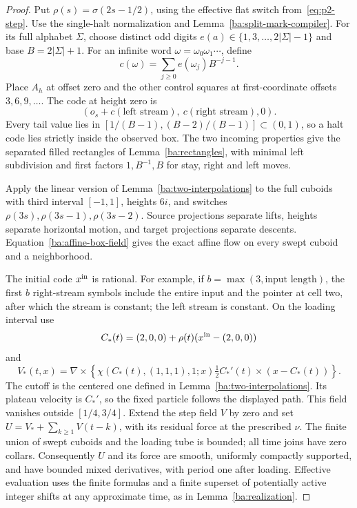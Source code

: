 \begin{proof}\label{ba:bounded-box-euclidean-proof}
Put $\rho(s)=\sigma(2s-1/2)$, using the effective flat switch
from~\eqref{eq:p2-step}.
Use the single-halt normalization and
Lemma~\ref{ba:split-mark-compiler}.  For its full alphabet $\Sigma$,
choose distinct odd digits $e(a)\in\{1,3,\ldots,2|\Sigma|-1\}$ and
base $B=2|\Sigma|+1$.  For an infinite word
$\omega=\omega_0\omega_1\cdots$, define
\[
 c(\omega)=\sum_{j\ge0}e(\omega_j)B^{-j-1}.
\]
Place $A_h$ at offset zero and the
other control squares at first-coordinate offsets $3,6,9,\ldots$.
The code at height zero is
\[
 (o_s+c(\text{left stream}),\ c(\text{right stream}),0).
\]
Every tail value lies in
$[1/(B-1),(B-2)/(B-1)]\subset(0,1)$, so a halt code lies strictly
inside the observed box.  The two incoming properties give the
separated filled rectangles of Lemma~\ref{ba:rectangles}, with
minimal left subdivision and first factors $1,B^{-1},B$ for stay,
right and left moves.

Apply the linear version of Lemma~\ref{ba:two-interpolations} to
the full cuboids with third interval $[-1,1]$, heights $6i$, and
switches $\rho(3s),\rho(3s-1),\rho(3s-2)$.  Source projections
separate lifts, heights separate horizontal motion, and target
projections separate descents.  Equation~\eqref{ba:affine-box-field}
gives the exact affine flow on every swept cuboid and a neighborhood.

The initial code $x^{\rm in}$ is rational.  For example, if
$b=\max(3,\text{input length})$, the first $b$ right-stream symbols
include the entire input and the pointer at cell two, after which the
stream is constant; the left stream is constant.  On the loading
interval use
\[
 C_*(t)=(2,0,0)+\rho(t)(x^{\rm in}-(2,0,0))
\]
and
\[
 V_*(t,x)=\nabla\times\left\{
 \chi(C_*(t),(1,1,1),1;x)
 \tfrac12 C_*'(t)\times(x-C_*(t))\right\}.
\]
The cutoff is the centered one defined in
Lemma~\ref{ba:two-interpolations}.  Its plateau velocity is $C_*'$, so
the fixed particle follows the displayed path.  This field vanishes
outside $[1/4,3/4]$.  Extend the step field $V$ by zero and set
$U=V_*+\sum_{k\ge1}V(t-k)$, with its residual force at the prescribed
$\nu$.  The finite union of swept cuboids and the loading tube is
bounded; all time joins have zero collars.  Consequently $U$ and its
force are smooth, uniformly compactly supported, and have bounded
mixed derivatives, with period one after loading.  Effective evaluation
uses the finite formulas and a finite superset of potentially active
integer shifts at any approximate time, as in
Lemma~\ref{ba:realization}.


\end{proof}
